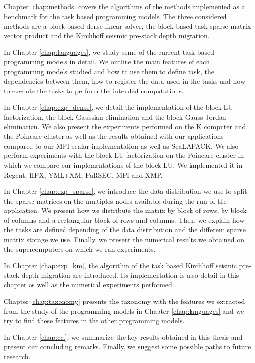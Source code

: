 Chapter \ref{chap:methods} covers the algorithms of the methods implemented as a benchmark for the task based programming models.
The three considered methods are a block based dense linear solver, the block based task sparse matrix vector product and the Kirchhoff seismic pre-stack depth migration.

In Chapter \ref{chap:languages}, we study some of the current task based programming models in detail.
We outline the main features of each programming models studied and how to use them to define task, the dependencies between them, how to register the data used in the tasks and how to execute the tasks to perform the intended computations.

In Chapter \ref{chap:exp_dense}, we detail the implementation of the block LU factorization, the block Gaussian elimination and the block Gauss-Jordan elimination.
We also present the experiments performed on the K computer and the Poincare cluster as well as the results obtained with our applications compared to our MPI scalar implementation as well as ScaLAPACK.
We also perform experiments with the block LU factorization on the Poincare cluster in which we compare our implementations of the block LU.
We implemented it in Regent, HPX, YML+XM, PaRSEC, MPI and XMP.

In Chapter \ref{chap:exp_sparse}, we introduce the data distribution we use to split the sparse matrices on the multiples nodes available during the run of the application.
We present how we distribute the matrix by block of rows, by block of columns and a rectangular block of rows and columns.
Then, we explain how the tasks are defined depending of the data distribution and the different sparse matrix storage we use.
Finally, we present the numerical results we obtained on the supercomputers on which we ran experiments.

In Chapter \ref{chap:exp_km}, the algorithm of the task based Kirchhoff seismic pre-stack depth migration are introduced.
Its implementation is also detail in this chapter as well as the numerical experiments performed.

Chapter \ref{chap:taxonomy} presents the taxonomy with the features we extracted from the study of the programming models in Chapter \ref{chap:languages} and we try to find these features in the other programming models.


In Chapter \ref{chap:ccl}, we summarize the key results obtained in this thesis and present our concluding remarks.
Finally, we suggest some possible paths to future research.
